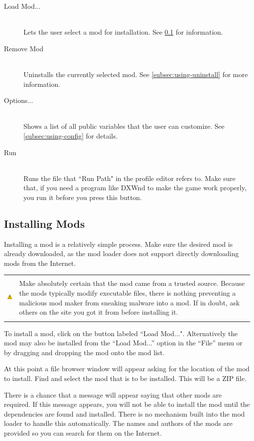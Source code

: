 \documentclass[12pt,a4paper,notitlepage]{article}
\newcommand{\warning}[1]{
    \begin{tabular}{m{1.1cm}  m{11cm}}
    &\\
    \includegraphics[width=1.1cm, height=1.1cm]{warning} & #1
    \\&\\
    \end{tabular}
}
\begin{document}
\begin{description}
\item[Load Mod...] \hfill \\ 
    Lets the user select a mod for installation. See \ref{subsec:using-install} for information.
\item[Remove Mod] \hfill \\
    Uninstalls the currently selected mod. See \ref{subsec:using-uninstall} for more information.
\item[Options...] \hfill \\
    Shows a list of all public variables that the user can customize. See \ref{subsec:using-config} for details.
\item[Run] \hfill \\
    Runs the file that ``Run Path" in the profile editor refers to. Make sure that, if you need a program like DXWnd to make the game work properly, you run it before you press this button.
\end{description}


\subsection{Installing Mods}
\label{subsec:using-install}
Installing a mod is a relatively simple process. Make sure the desired mod is already downloaded, as the mod loader does not support directly downloading mods from the Internet.

\warning{Make absolutely certain that the mod came from a trusted source. Because the mods typically modify executable files, there is nothing preventing a malicious mod maker from sneaking malware into a mod. If in doubt, ask others on the site you got it from before installing it.}

To install a mod, click on the button labeled ``Load Mod...". Alternatively the mod may also be installed from the ``Load Mod...'' option in the ``File'' menu or by dragging and dropping the mod onto the mod list.

At this point a file browser window will appear asking for the location of the mod to install. Find and select the mod that is to be installed. This will be a ZIP file.

There is a chance that a message will appear saying that other mods are required. If this message appears, you will not be able to install the mod until the dependencies are found and installed. There is no mechanism built into the mod loader to handle this automatically. The names and authors of the mods are provided so you can search for them on the Internet.
\end{document}
